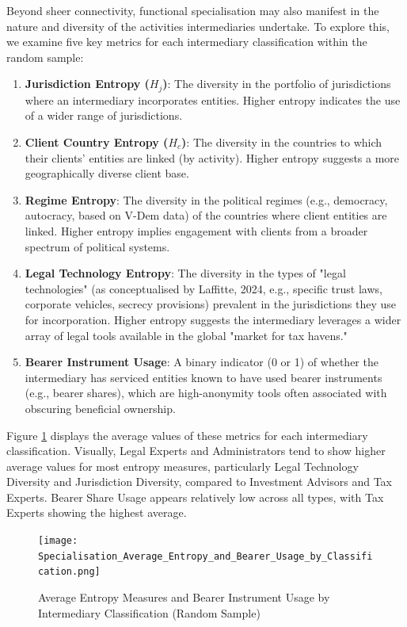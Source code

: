 Beyond sheer connectivity, functional specialisation may also manifest in the nature and diversity of the activities intermediaries undertake. To explore this, we examine five key metrics for each intermediary classification within the random sample:
\begin{enumerate}
    \item \textbf{Jurisdiction Entropy ($H_j$)}: The diversity in the portfolio of jurisdictions where an intermediary incorporates entities. Higher entropy indicates the use of a wider range of jurisdictions.
    \item \textbf{Client Country Entropy ($H_c$)}: The diversity in the countries to which their clients' entities are linked (by activity). Higher entropy suggests a more geographically diverse client base.
    \item \textbf{Regime Entropy}: The diversity in the political regimes (e.g., democracy, autocracy, based on V-Dem data) of the countries where client entities are linked. Higher entropy implies engagement with clients from a broader spectrum of political systems.
    \item \textbf{Legal Technology Entropy}: The diversity in the types of "legal technologies" (as conceptualised by Laffitte, 2024, e.g., specific trust laws, corporate vehicles, secrecy provisions) prevalent in the jurisdictions they use for incorporation. Higher entropy suggests the intermediary leverages a wider array of legal tools available in the global "market for tax havens."
    \item \textbf{Bearer Instrument Usage}: A binary indicator (0 or 1) of whether the intermediary has serviced entities known to have used bearer instruments (e.g., bearer shares), which are high-anonymity tools often associated with obscuring beneficial ownership.
\end{enumerate}

Figure \ref{fig:specialisation_average_entropy_bearer} displays the average values of these metrics for each intermediary classification. Visually, Legal Experts and Administrators tend to show higher average values for most entropy measures, particularly Legal Technology Diversity and Jurisdiction Diversity, compared to Investment Advisors and Tax Experts. Bearer Share Usage appears relatively low across all types, with Tax Experts showing the highest average.

\begin{figure}[htbp]
    \centering
    \texttt{[image: Specialisation\_Average\_Entropy\_and\_Bearer\_Usage\_by\_Classification.png]}
    \caption{Average Entropy Measures and Bearer Instrument Usage by Intermediary Classification (Random Sample)}
    \label{fig:specialisation_average_entropy_bearer}
\end{figure}

